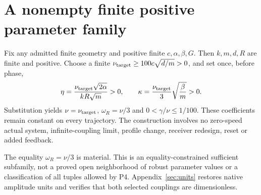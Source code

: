 \section{A nonempty finite positive parameter family}\label{sec:finite}
Fix any admitted finite geometry and positive finite $c,\alpha,\beta,G$. Then $k,m,d,R$ are finite and positive. Choose a finite
$\nu_{\rm target}\ge100c\sqrt{d/m}>0$, and set once, before phase,
\begin{equation}\label{eq:finitechoice}%
 \eta=\frac{\nu_{\rm target}\sqrt{2\alpha}}{kR\sqrt m}>0,\qquad
 \kappa=\frac{\nu_{\rm target}}3\sqrt{\frac{\beta}{m}}>0 .
\end{equation}
Substitution yields $\nu=\nu_{\rm target}$, $\omega_R=\nu/3$ and
$0<\gamma/\nu\le1/100$. These coefficients remain constant on every trajectory. The construction involves no zero-speed actual system, infinite-coupling limit, profile change, receiver redesign, reset or added feedback.

The equality $\omega_R=\nu/3$ is material. This is an equality-constrained sufficient subfamily, not a proved open neighborhood of robust parameter values or a classification of all tuples allowed by P4. Appendix~\ref{sec:units} restores native amplitude units and verifies that both selected couplings are dimensionless.
